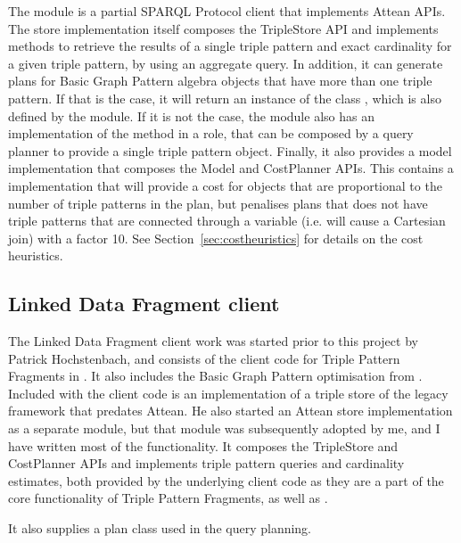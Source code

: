 \documentclass[a4paper, 12pt]{article}
\begin{document}
The  module is a partial SPARQL
Protocol client that implements Attean APIs. The store implementation
itself composes the TripleStore API and implements methods to retrieve
the results of a single triple pattern and exact cardinality for a
given triple pattern, by using an aggregate query. In addition, it can
generate plans for Basic Graph Pattern algebra objects that have more
than one triple pattern. If that is the case, it will return an
instance of the class , which is
also defined by the module. If it is not the case, the module also has
an implementation of the  method in a
 role, that can be
composed by a query planner to provide a single triple pattern
 object. Finally, it also provides a
model implementation that composes the Model and CostPlanner
APIs. This contains a  implementation that will
provide a cost for  objects that are
proportional to the number of triple patterns in the plan, but
penalises plans that does not have triple patterns that are connected
through a variable (i.e. will cause a Cartesian join) with a factor
10. See Section~\ref{sec:costheuristics} for details on the cost
heuristics.

\subsection{Linked Data Fragment client}\label{sec:ldfclient}

The Linked Data Fragment client work was started prior to this project
by Patrick Hochstenbach, and consists of the client code for Triple
Pattern Fragments in . It also includes the Basic
Graph Pattern optimisation from \cite{verborgh2014querying}. Included with the client
code is an implementation of a triple store of the legacy
 framework that predates Attean. He also started
an Attean store implementation  as a
separate module, but that module was subsequently adopted by me, and I
have written most of the functionality. It composes the TripleStore
and CostPlanner APIs and implements triple pattern queries and
cardinality estimates, both provided by the underlying client code as
they are a part of the core functionality of Triple Pattern Fragments,
as well as .

It also supplies a plan class 
used in the query planning. 
\end{document}
